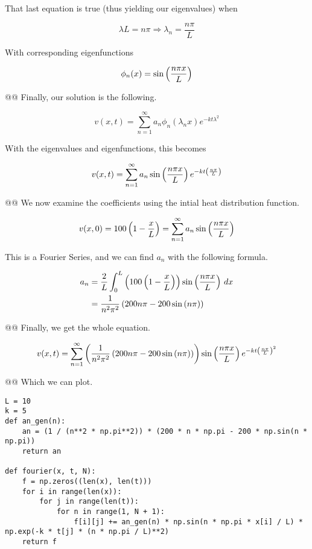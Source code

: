 \documentclass[10pt]{article}
\begin{document}
\begin{easylist}[enumerate]
    That last equation is true (thus yielding our eigenvalues) when

    \[
        \lambda L = n \pi \Rightarrow \lambda_n = \frac{n \pi}{L}
    \]

    With corresponding eigenfunctions

    \[
        \phi_n(x) = \sin\left( \frac{n \pi x}{L} \right)
    \]

    @@ Finally, our solution is the following.

    \[
        v(x, t) = \sum_{n=1}^\infty a_n \phi_n(\lambda_n x) e^{-kt\lambda^2}
    \]

    With the eigenvalues and eigenfunctions, this becomes

    \[
        v(x, t) = \sum_{n=1}^\infty a_n \sin\left( \frac{n\pi x}{L} \right) e^{-kt \left( \frac{n \pi}{L} \right)}
    \]

    @@ We now examine the coefficients using the intial heat distribution function.

    \[
        v(x, 0) = 100 \left( 1 - \frac{x}{L} \right) = \sum_{n=1}^\infty a_n \sin\left( \frac{n\pi x}{L} \right)
    \]

    This is a Fourier Series, and we can find $a_n$ with the following formula.

    \begin{align*}
        a_n &= \frac{2}{L} \int_0^L \left( 100 \left( 1 - \frac{x}{L} \right) \right) \sin\left( \frac{n \pi x}{L} \right) \, dx\\
        &= \frac{1}{n^{2} \pi^{2}} \left(200 n \pi - 200 \sin{\left (n \pi \right )}\right)
    \end{align*}

    @@ Finally, we get the whole equation.

    \[
        v(x, t) = \sum_{n=1}^\infty \left( \frac{1}{n^{2} \pi^{2}} \left(200 n \pi - 200 \sin{\left (n \pi \right)}\right) \right) \sin\left( \frac{n\pi x}{L} \right) e^{-kt \left( \frac{n \pi}{L} \right)^2}
    \]

    @@ Which we can plot.

\weave

\begin{verbatim}
L = 10
k = 5
def an_gen(n):
    an = (1 / (n**2 * np.pi**2)) * (200 * n * np.pi - 200 * np.sin(n *
np.pi))
    return an

def fourier(x, t, N):
    f = np.zeros((len(x), len(t)))
    for i in range(len(x)):
        for j in range(len(t)):
            for n in range(1, N + 1):
                f[i][j] += an_gen(n) * np.sin(n * np.pi * x[i] / L) *
np.exp(-k * t[j] * (n * np.pi / L)**2)
    return f


\end{verbatim}
\end{easylist}
\end{document}
